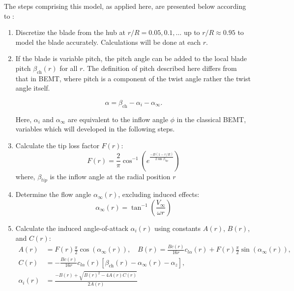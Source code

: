 \documentclass{Format}
\begin{document}
The steps comprising this model, as applied here, are presented below according to \cite{traub2016}:
\begin{enumerate}
    \item Discretize the blade from the hub at \( r/R = 0.05, 0.1, \dots \) up to \( r/R \approx 0.95 \) to model the blade accurately. Calculations will be done at each \( r \).
    
    \item If the blade is variable pitch, the pitch angle can be added to the local blade pitch \( \beta_{\text{ch}}(r) \) for all $r$. The definition of pitch described here differs from that in BEMT, where pitch is a component of the twist angle rather the twist angle itself.  

    \begin{equation}
        \alpha = \beta_{\text{ch}} - \alpha_i - \alpha_{\infty}.
    \end{equation}
    
    Here, \(\alpha_i\) and \(\alpha_{\infty}\) are equivalent to the inflow angle \(\phi\) in the classical BEMT, variables which will developed in the following steps.
    
    \item Calculate the tip loss factor \( F(r) \):
    \begin{equation}\label{eq:tip_loss}
        F(r) = \frac{2}{\pi} \cos^{-1} \left( e^{\frac{-B(1 - r/R)}{2 \sin \beta_{\text{tip}}}} \right)
    \end{equation}
    where, \( \beta_{tip} \) is the inflow angle at the radial position \( r \)
    
    \item Determine the flow angle \(\alpha_{\infty}(r)\), excluding induced effects:
    \begin{equation}
        \alpha_{\infty}(r) = \tan^{-1}\left( \frac{V_{\infty}}{\omega r} \right)
    \end{equation}

    \item Calculate the induced angle-of-attack \(\alpha_i(r)\) using constants \(A(r)\), \(B(r)\), and \(C(r)\):
    \begin{equation}
        \begin{aligned}
            A(r) &= F(r) \frac{\pi}{2} \cos(\alpha_{\infty}(r)), \quad B(r) = \frac{Bc(r)}{16r} c_{l\alpha}(r) + F(r) \frac{\pi}{2} \sin(\alpha_{\infty}(r)), \\
            C(r) &= -\frac{Bc(r)}{16r} c_{l\alpha}(r) [\beta_{\text{ch}}(r) - \alpha_{\infty}(r) - \alpha_{z}], \\
            \alpha_i(r) &= \frac{-B(r) + \sqrt{B(r)^2 - 4A(r)C(r)}}{2A(r)}
        \end{aligned}
    \end{equation}
    

\end{enumerate}
\end{document}
